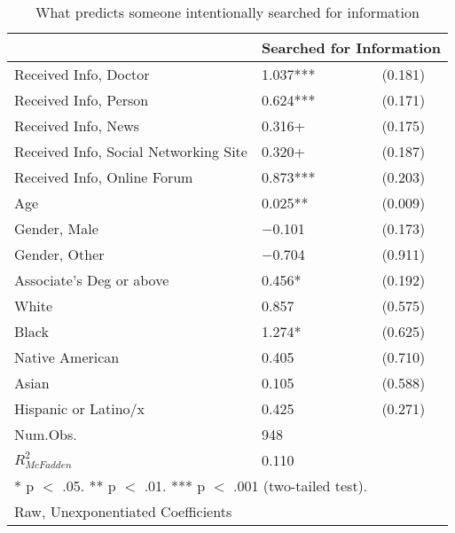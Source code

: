 \begin{table}[!ht]
\caption{\label{tab:table-model-1}What predicts someone intentionally searched for information}
\centering
\begin{tabular}{llc}
\toprule
  & \multicolumn{2}{l}{Searched for Information} \\
\midrule
Received Info, Doctor & \num{1.037}***  & (\num{0.181})\\
Received Info, Person & \num{0.624}***  & (\num{0.171})\\
Received Info, News & \num{0.316}+  & (\num{0.175})\\
Received Info, Social Networking Site & \num{0.320}+ &  (\num{0.187})\\
Received Info, Online Forum & \num{0.873}***  & (\num{0.203})\\
Age & \num{0.025}**  & (\num{0.009})\\
Gender, Male & \num{-0.101}  & (\num{0.173})\\
Gender, Other & \num{-0.704}  & (\num{0.911})\\
Associate's Deg or above & \num{0.456}*  & (\num{0.192})\\
White & \num{0.857}  & (\num{0.575})\\
Black & \num{1.274}*  & (\num{0.625})\\
Native American & \num{0.405}  & (\num{0.710})\\
Asian & \num{0.105}  & (\num{0.588})\\
Hispanic or Latino/x & \num{0.425}  & (\num{0.271})\\
Num.Obs. & \num{948} & \\
\midrule
$R_{McFadden}^2$ & \num{0.110} & \\
\bottomrule
\multicolumn{3}{l}{\rule{0pt}{1em}* p $<$ .05. ** p $<$ .01. *** p $<$ .001 (two-tailed test).}\\
\multicolumn{3}{l}{\rule{0pt}{1em}Raw, Unexponentiated Coefficients}\\
\end{tabular}
\end{table}